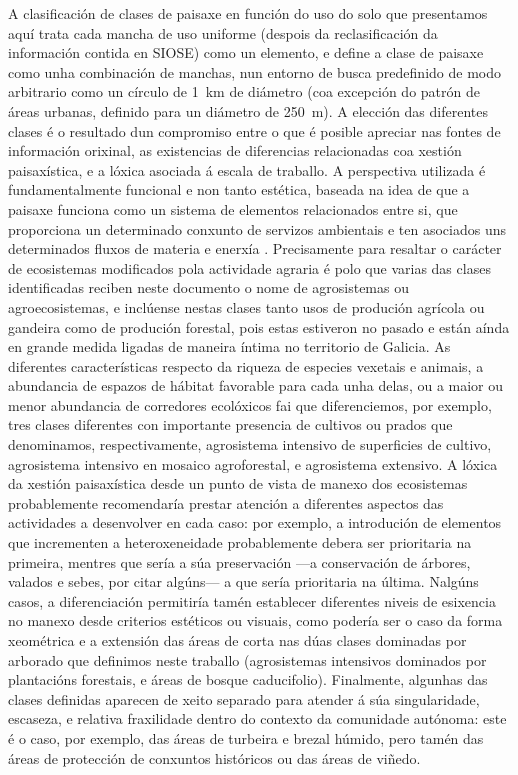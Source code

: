 \documentclass[11pt,a4paper]{article}
\begin{document}
A clasificación de clases de paisaxe en función do uso do solo que presentamos aquí trata cada mancha de uso uniforme (despois da reclasificación da información contida en SIOSE) como un elemento, e define a clase de paisaxe como unha combinación de manchas, nun entorno de busca predefinido de modo arbitrario como un círculo de 1~km de diámetro (coa excepción do patrón de áreas urbanas, definido para un diámetro de 250~m). A elección das diferentes clases é o resultado dun compromiso entre o que é posible apreciar nas fontes de información orixinal, as existencias de diferencias relacionadas coa xestión paisaxística, e a lóxica asociada á escala de traballo. A perspectiva utilizada é fundamentalmente funcional e non tanto estética, baseada na idea de que a paisaxe funciona como un sistema de elementos relacionados entre si, que proporciona un determinado conxunto de servizos ambientais e ten asociados uns determinados fluxos de materia e enerxía \citep{Forman1986}. Precisamente para resaltar o carácter de ecosistemas modificados pola actividade agraria é polo que varias das clases identificadas reciben neste documento o nome de agrosistemas ou agroecosistemas, e inclúense nestas clases tanto usos de produción agrícola ou gandeira como de produción forestal, pois estas estiveron no pasado e están aínda en grande medida ligadas de maneira íntima no territorio de Galicia. As diferentes características respecto da riqueza de especies vexetais e animais, a abundancia de espazos de hábitat favorable para cada unha delas, ou a maior ou menor abundancia de corredores ecolóxicos fai que diferenciemos, por exemplo, tres clases diferentes con importante presencia de cultivos ou prados que denominamos, respectivamente, agrosistema intensivo de superficies de cultivo, agrosistema intensivo en mosaico agroforestal, e agrosistema extensivo. A lóxica da xestión paisaxística desde un punto de vista de manexo dos ecosistemas probablemente recomendaría prestar atención a diferentes aspectos das actividades a desenvolver en cada caso: por exemplo, a introdución de elementos que incrementen a heteroxeneidade probablemente debera ser prioritaria na primeira, mentres que sería a súa preservación ---a conservación de árbores, valados e sebes, por citar algúns--- a que sería prioritaria na última. Nalgúns casos, a diferenciación permitiría tamén establecer diferentes niveis de esixencia no manexo desde criterios estéticos ou visuais, como podería ser o caso da forma xeométrica e a extensión das áreas de corta nas dúas clases dominadas por arborado que definimos neste traballo (agrosistemas intensivos dominados por plantacións forestais, e áreas de bosque caducifolio). Finalmente, algunhas das clases definidas aparecen de xeito separado para atender á súa singularidade, escaseza, e relativa fraxilidade dentro do contexto da comunidade autónoma: este é o caso, por exemplo, das áreas de turbeira e brezal húmido, pero tamén das áreas de protección de conxuntos históricos ou das áreas de viñedo. 
\end{document}
